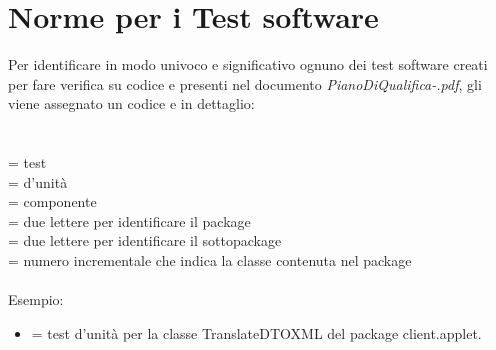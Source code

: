\section{Norme per i Test software}
Per identificare in modo univoco e significativo ognuno dei test software creati
per fare verifica su codice e presenti nel documento \emph{PianoDiQualifica-\versionePQ.pdf}, gli viene assegnato un codice e in
dettaglio:\\ \\
 \\
 = test \\
 = d'unit\`a \\
 = componente \\
 = due lettere per identificare il package \\
 = due lettere per identificare il sottopackage \\
 = numero incrementale che indica la classe contenuta nel package
\\ \\
Esempio:
\begin{itemize}
  \item {} = test d'unit\`a per la classe TranslateDTOXML del
  package client.applet.
\end{itemize}














